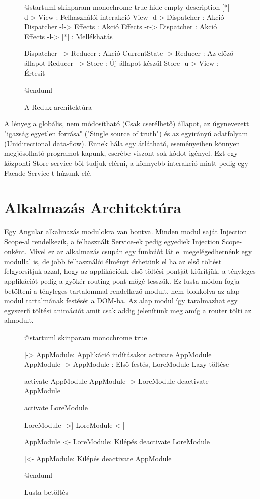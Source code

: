 \begin{figure}[h!]
	\centering
	\begin{plantuml}
		@startuml
		skinparam monochrome true
		hide empty description
		[*] -d-> View : Felhasználói interakció
		View -d-> Dispatcher : Akció
		Dispatcher -l-> Effects : Akció
		Effects -r-> Dispatcher : Akció
		Effects -l-> [*] : Mellékhatás

		Dispatcher --> Reducer : Akció
		CurrentState -> Reducer : Az előző állapot
		Reducer --> Store : Új állapot készül
		Store -u-> View : Értesít

		@enduml
	\end{plantuml}
	\caption{A Redux architektúra}
	\label{fig:redux-architecture}
\end{figure}

A lényeg a globális, nem módosítható (Csak cserélhető) állapot, az úgynevezett "igazság egyetlen forrása" ("Single source of truth") és az egyirányú adatfolyam (Unidirectional data-flow). Ennek hála egy átlátható, eseményeiben könnyen megjósolható programot kapunk, cserébe viszont sok kódot igényel.
Ezt egy központi Store service-ből tudjuk elérni, a könnyebb interakció miatt pedig egy Facade\cite{Facade} Service-t húzunk elé.

\section{Alkalmazás Architektúra}

Egy Angular alkalmazás modulokra van bontva. Minden modul saját Injection Scope-al rendelkezik, a felhasznált Service-ek pedig egyediek Injection Scope-onként. Mivel ez az alkalmazás csupán egy funkciót lát el megelégedhetnénk egy modullal is, de jobb felhasználói élményt érhetünk el ha az első töltést felgyorsítjuk azzal, hogy az applikációnk első töltési pontját kiürítjük, a tényleges applikációt pedig a gyökér routing pont mögé tesszük. Ez lusta módon \cite{LazyLoad} fogja betölteni a tényleges tartalommal rendelkező modult, nem blokkolva az alap modul tartalmának festését a DOM-ba. Az alap modul így taralmazhat egy egyszerű töltési animációt amit csak addig jelenítünk meg amíg a router tölti az almodult.

\begin{figure}[h!]
	\centering
	\begin{plantuml}
		@startuml
		skinparam monochrome true

		[-> AppModule: Applikáció indításakor
		activate AppModule
		AppModule -> AppModule : Első festés, LoreModule Lazy töltése

		activate  AppModule
		AppModule -> LoreModule
		deactivate AppModule

		activate LoreModule

		LoreModule ->]
		LoreModule <-]


		AppModule <- LoreModule: Kilépés
		deactivate LoreModule

		[<- AppModule: Kilépés
		deactivate AppModule

		@enduml


	\end{plantuml}
	\caption{Lusta betöltés}
	\label{fig:lazy-loading}
\end{figure}


